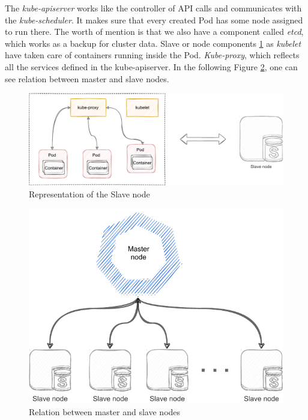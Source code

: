 The \emph{kube-apiserver} works like the controller of API calls and communicates with the \emph{kube-scheduler}. It makes sure that every created Pod has some node assigned to run there. The worth of mention is that we also have a component called \emph{etcd}, which works as a backup for cluster data. Slave or node components \ref{02:fig:slaveNode} as \emph{kubelet} have taken care of containers running inside the Pod. \emph{Kube-proxy}, which reflects all the services defined in the kube-apiserver. In the following Figure \ref{02:fig:masterAndSlaveNode}, one can see relation between master and slave nodes.

\begin{figure}[!h]
    \centering
\includegraphics[scale=0.82]{obrazky-figures/02-preliminaries/01-kubernetes/02-architecture-slave-sketch.pdf}
    \caption{Representation of the Slave node}
    \label{02:fig:slaveNode}
\end{figure}


\begin{figure}[!h]
    \centering
    \includegraphics[scale=0.92]{obrazky-figures/02-preliminaries/01-kubernetes/02-final-architecture-master-slave.pdf}
    \caption{Relation between master and slave nodes}
    \label{02:fig:masterAndSlaveNode}
\end{figure}

